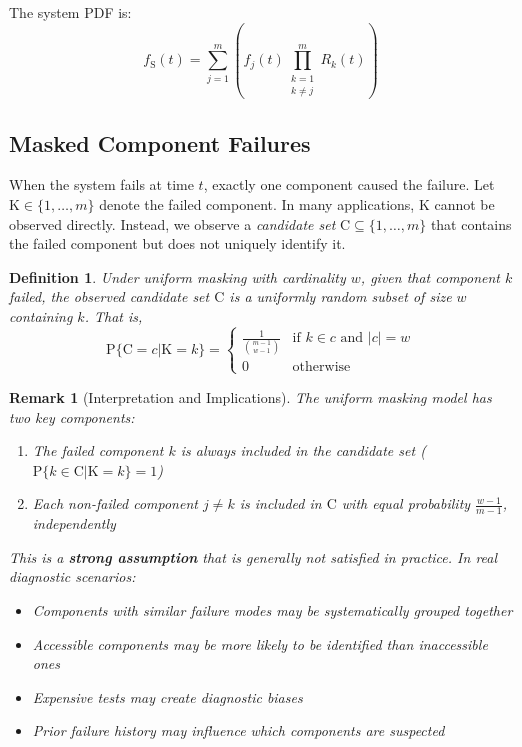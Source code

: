 \documentclass[pdflatex,sn-mathphys-num,Numbered]{sn-jnl}
\newcommand{\RV}[1]{\mathrm{#1}}
\newcommand{\Prob}[1]{\mathrm{P}\{#1\}}
\newcommand{\sv}{\RV{S}}           %
\newcommand{\cand}{\RV{C}}         %
\newcommand{\pdf}{f}
\newcommand{\srv}{R}
\newcommand{\spdf}{\pdf_{\sv}}
\theoremstyle{thmstyleone}
\theoremstyle{thmstylethree}
\newtheorem{definition}[theorem]{Definition}
\theoremstyle{thmstyletwo}
\newtheorem{remark}[theorem]{Remark}
\begin{document}
The system PDF is:
\begin{equation}
\label{eq:system_pdf}
\spdf(t) = \sum_{j=1}^{m} \left(\pdf_j(t) \prod_{\substack{k=1\\k \neq j}}^{m} \srv_k(t)\right)
\end{equation}

\subsection{Masked Component Failures}

When the system fails at time $t$, exactly one component caused the failure. Let $\RV{K} \in \{1, \ldots, m\}$ denote the failed component. In many applications, $\RV{K}$ cannot be observed directly. Instead, we observe a \emph{candidate set} $\cand \subseteq \{1, \ldots, m\}$ that contains the failed component but does not uniquely identify it.

\begin{definition}
\label{def:uniform_masking}
Under \emph{uniform masking} with cardinality $w$, given that component $k$ failed, the observed candidate set $\cand$ is a uniformly random subset of size $w$ containing $k$. That is,
\begin{equation}
\Prob{\cand = c | \RV{K} = k} = \begin{cases}
\frac{1}{\binom{m-1}{w-1}} & \text{if } k \in c \text{ and } |c| = w \\
0 & \text{otherwise}
\end{cases}
\end{equation}
\end{definition}

\begin{remark}[Interpretation and Implications]
The uniform masking model has two key components:
\begin{enumerate}
\item The failed component $k$ is \emph{always} included in the candidate set ($\Prob{k \in \cand | \RV{K} = k} = 1$)
\item Each non-failed component $j \neq k$ is included in $\cand$ with \emph{equal probability} $\frac{w-1}{m-1}$, independently
\end{enumerate}

This is a \textbf{strong assumption} that is generally \emph{not satisfied in practice}. In real diagnostic scenarios:
\begin{itemize}
\item Components with similar failure modes may be systematically grouped together
\item Accessible components may be more likely to be identified than inaccessible ones
\item Expensive tests may create diagnostic biases
\item Prior failure history may influence which components are suspected
\end{itemize}
\end{remark}
\end{document}
